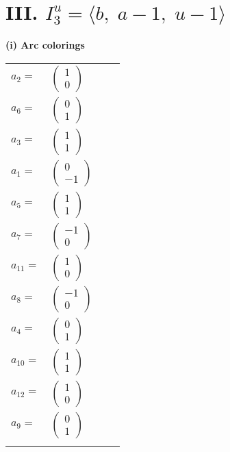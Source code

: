 \documentclass[1p]{elsarticle_modified}
\theoremstyle{definition}
\begin{document}
\centering \section*{III. $I^u_{3}= \langle b,\;a-1,\;u-1 \rangle$}
\flushleft \textbf{(i) Arc colorings}\\
\begin{tabular}{m{7pt} m{180pt} m{7pt} m{180pt} }
\flushright $a_{2}=$&$\begin{pmatrix}1\\0\end{pmatrix}$ \\
\flushright $a_{6}=$&$\begin{pmatrix}0\\1\end{pmatrix}$ \\
\flushright $a_{3}=$&$\begin{pmatrix}1\\1\end{pmatrix}$ \\
\flushright $a_{1}=$&$\begin{pmatrix}0\\-1\end{pmatrix}$ \\
\flushright $a_{5}=$&$\begin{pmatrix}1\\1\end{pmatrix}$ \\
\flushright $a_{7}=$&$\begin{pmatrix}-1\\0\end{pmatrix}$ \\
\flushright $a_{11}=$&$\begin{pmatrix}1\\0\end{pmatrix}$ \\
\flushright $a_{8}=$&$\begin{pmatrix}-1\\0\end{pmatrix}$ \\
\flushright $a_{4}=$&$\begin{pmatrix}0\\1\end{pmatrix}$ \\
\flushright $a_{10}=$&$\begin{pmatrix}1\\1\end{pmatrix}$ \\
\flushright $a_{12}=$&$\begin{pmatrix}1\\0\end{pmatrix}$ \\
\flushright $a_{9}=$&$\begin{pmatrix}0\\1\end{pmatrix}$\\&\end{tabular}
\end{document}
